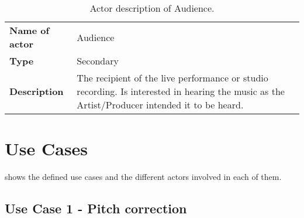 \begin{table}[H]
	\centering
	\begin{tabularx}{\textwidth}{p{} X}
		\toprule
		\textbf{Name of actor} & Audience \\
		\textbf{Type} & Secondary \\
		\textbf{Description} & The recipient of the live performance or studio recording. Is interested in hearing the music as the Artist/Producer intended it to be heard. \\
		\bottomrule
	\end{tabularx}
	\caption{Actor description of Audience.}
	\label{tab:actorAudience}
\end{table}

\section{Use Cases}
\label{rap:UC}
 shows the defined use cases and the different actors involved in each of them.

\subsection{Use Case 1 - Pitch correction}

